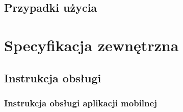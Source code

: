\documentclass{book}
\begin{document}
		\section{Przypadki użycia}
		
		
	\chapter{Specyfikacja zewnętrzna}
		\section{Instrukcja obsługi}
		\subsection{Instrukcja obsługi aplikacji mobilnej}
		
\end{document}
